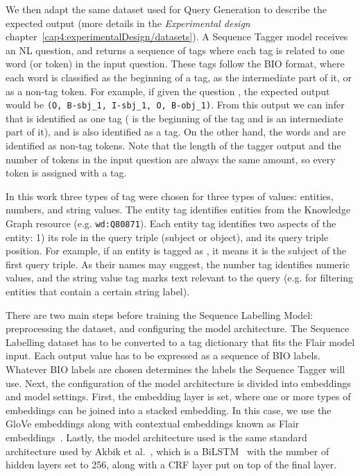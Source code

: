 We then adapt the same dataset used for Query Generation to describe the expected output (more 
details in the \textit{Experimental design} chapter~\ref{cap4:experimentalDesign/datasets}). 
A Sequence Tagger model receives an NL 
question, and returns a sequence of tags where each tag is related to one word (or token) in 
the input question. These tags follow the BIO format, where each word is classified as the 
beginning of a tag, as the intermediate part of it, or as a non-tag token. For example, if 
given the question , the expected output would be 
\texttt{(O, B-sbj\_1, I-sbj\_1, O, B-obj\_1)}. From this output we can infer that 
 is identified as one tag ( is the beginning of 
the tag and  is an intermediate part of it), and  is also 
identified as a tag. On the other hand, the words  and  are identified 
as non-tag tokens. Note that the length of the tagger output and the number of tokens in the 
input question are always the same amount, so every token is assigned with a tag.

In this work three types of tag were chosen for three types of values: entities, numbers, and 
string values. The entity tag identifies entities from the Knowledge Graph resource (e.g. 
\texttt{wd:Q80871}). Each entity tag identifies two aspects of the entity: 1) its role in the 
query triple (subject or object), and its query triple position. For example, if an entity is 
tagged as , it means it is the subject of the first query triple. As their 
names may suggest, the number tag identifies numeric values, and the string value tag marks 
text relevant to the query (e.g. for filtering entities that contain a certain string label).

There are two main steps before training the Sequence Labelling Model: preprocessing the 
dataset, and configuring the model architecture. The Sequence Labelling dataset has to be 
converted to a tag dictionary that fits the Flair model input. Each output value has to be 
expressed as a sequence of BIO labels. Whatever BIO labels are chosen determines the labels 
the Sequence Tagger will use. Next, the configuration of the model architecture is divided 
into embeddings and model settings. First, the embedding layer is set, where one or more 
types of embeddings can be joined into a stacked embedding. In this case, we use the GloVe 
embeddings along with contextual embeddings known as Flair embeddings~\cite{seqlab:flair-AkbikBBRSV19}. 
Lastly, the model architecture used is the same standard architecture used by 
Akbik et al.~\cite{seqlab:contextual-emb-AkbikBV18}, which is a BiLSTM~\cite{seqlab:HuangXY15} 
with the number of hidden layers set to 256, along with a CRF layer put on top of the final 
layer. 

